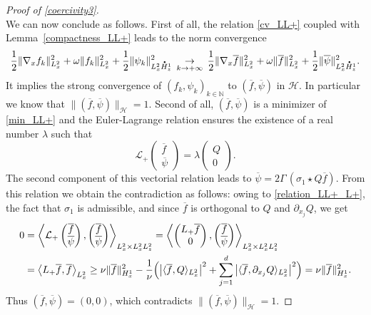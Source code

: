 \documentclass[JEP,XML,SOM,NoEqCountersInSection,NoFloatCountersInSection,Unicode,published]{cedram}
\let\bar\oldbar
\theoremstyle{definition}
\newcommand*{\overbigdot}[1]{%
\accentset{\mbox{\large\bfseries .}}{#1}}
\let\bar\overline
\newenvironment{ProofOf}[1]{\begin{proof}[Proof of #1]}{\end{proof}}
\begin{document}
\begin{ProofOf}{\eqref{coercivity3}}
\begin{equation}
\end{equation}
We can now conclude as follows. First of all, the relation \eqref{cv_LL+} coupled with Lemma~\ref{compactness_LL+} leads to the norm convergence
\[
\frac{1}{2}\|\nabla_{x}f_{k}\|_{L_{x}^{2}}^{2}+\omega\|f_{k}\|_{L_{x}^{2}}^{2}+\frac{1}{2}\|\psi_{k}\|_{L_{x}^{2}\overbigdot{H}_{z}^{1}}^{2}\,\underset{k\to +\infty}{\to}\,\frac{1}{2}\|\nabla_{x}\bar{f}\|_{L_{x}^{2}}^{2}+\omega\|\bar{f}\|_{L_{x}^{2}}^{2}+\frac{1}{2}\|\bar{\psi}\|_{L_{x}^{2}\overbigdot{H}_{z}^{1}}^{2}.
\]
It implies the strong convergence of $(f_{k},\psi_{k})_{k\in\mathbb N}$ to $(\bar{f},\bar{\psi})$ in $\mathscr{H}$. In particular we know that $\|(\bar{f},\bar{\psi})\|_{\mathscr{H}}=1$. Second of all, $(\bar{f},\bar{\psi})$ is a minimizer of \eqref{min_LL+} and the Euler-Lagrange relation ensures the existence of a real number $\lambda$ such that
\[
\mathcal{L}_{+}\begin{pmatrix} \bar{f}\\\bar{\psi} \end{pmatrix}=\lambda\begin{pmatrix} Q\\0 \end{pmatrix}.
\]
The second component of this vectorial relation leads to $\bar{\psi}=2\Gamma\,(\sigma_{1}\star Q\bar{f})$. From this relation we obtain the contradiction as follows: owing to \eqref{relation_LL+_L+}, the fact that $\sigma_1$ is admissible, and since $\bar{f}$ is orthogonal to $Q$ and $\partial_{x_{j}}Q$, we get
\begin{align*}
0&=\left\langle\mathcal{L}_{+}\begin{pmatrix} \bar{f}\\\bar{\psi} \end{pmatrix},\begin{pmatrix} \bar{f}\\\bar{\psi} \end{pmatrix}\right\rangle_{L_{x}^{2}\times L_{x}^{2}L_{z}^{2}}=\left\langle\begin{pmatrix} L_{+}\bar{f}\\0 \end{pmatrix},\begin{pmatrix} \bar{f}\\\bar{\psi} \end{pmatrix}\right\rangle_{L_{x}^{2}\times L_{x}^{2}L_{z}^{2}}\\
&=\left\langle L_{+}\bar{f},\bar{f}\right\rangle_{L_{x}^{2}}\geq\nu\|\bar{f}\|_{H_{x}^{1}}^{2}-\frac{1}{\nu}\Bigl(\left|\langle \bar{f},Q\rangle_{L_{x}^{2}}\right|^{2}+\sum\limits_{j=1}^{d}\left|\langle \bar{f},\partial_{x_{j}}Q\rangle_{L_{x}^{2}}\right|^{2}\Bigr)=\nu\|\bar{f}\|_{H_{x}^{1}}^{2}.
\end{align*}
Thus $(\bar{f},\bar{\psi})=(0,0)$, which contradicts $\|(\bar{f},\bar{\psi})\|_{\mathscr{H}}=1$.
\end{ProofOf}
\end{document}

